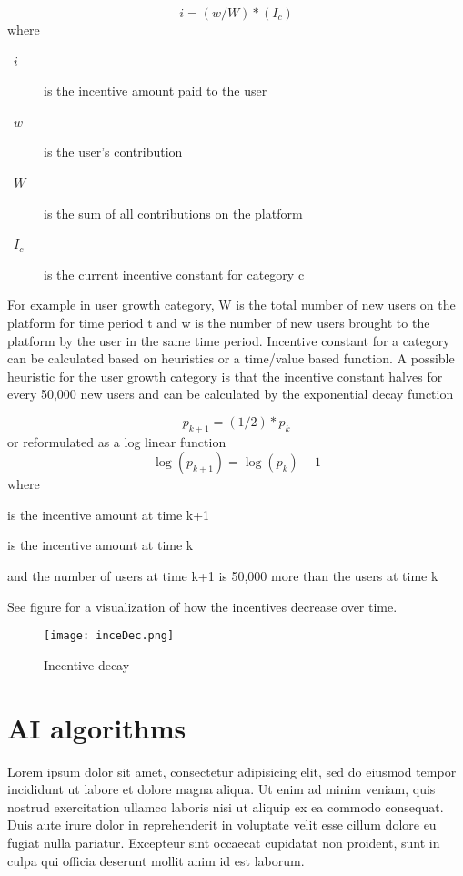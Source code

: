 \documentclass[a4paper]{article}
\begin{document}
\begin{equation}
i=(w/W)*(I_c)\label{eq:weighted_incentive}
\end{equation}
where
\begin{description}
\item[~$i$] is the incentive amount paid to the user
\item[~$w$] is the user's contribution
\item[~$W$] is the sum of all contributions on the platform
\item[~$I_c$] is the current incentive constant for category c
\end{description}
For example in user growth category, W is the total number of new users on the platform for time period t and w is the number of new users brought to the platform by the user in the same time period.
Incentive constant for a category can be calculated based on heuristics or a time/value based function. A possible heuristic for the user growth category is that the incentive constant halves for every 50,000 new users and can be calculated by the exponential decay function 

\begin{equation}
p_{k+1}=(1/2)*p_k\label{eq:exp_decay}
\end{equation}
or reformulated as a log linear function 
\begin{equation}
\log (p_{k+1})=\log (p_k) - 1\label{eq:log_exp_decay}
\end{equation}
where
\begin{description}
\item[~$p_{k+1}$] is the incentive amount at time k+1
\item[~$p_k$] is the incentive amount at time k
\item and the number of users at time k+1 is 50,000 more than the users at time k
\end{description}
See figure  for a visualization of how the incentives decrease over time.
\begin{figure}[t] \centering
\texttt{[image: inceDec.png]}
\caption{Incentive decay} \label{fig:inc_dec}
\end{figure}


\section{AI algorithms}
Lorem ipsum dolor sit amet, consectetur adipisicing elit, sed do eiusmod tempor
incididunt ut labore et dolore magna aliqua. Ut enim ad minim veniam, quis
nostrud exercitation ullamco laboris nisi ut aliquip ex ea commodo consequat.
Duis aute irure dolor in reprehenderit in voluptate velit esse cillum dolore eu
fugiat nulla pariatur. Excepteur sint occaecat cupidatat non proident, sunt in
culpa qui officia deserunt mollit anim id est laborum.
\end{document}
